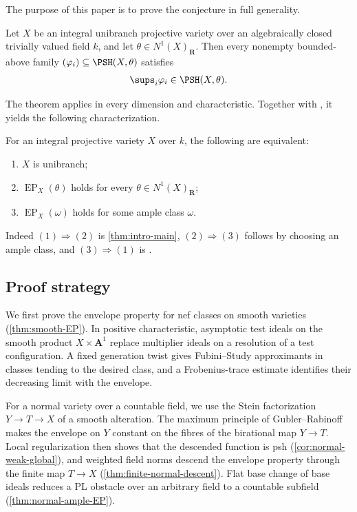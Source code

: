 \documentclass[11pt,a4paper]{article}
\newcommand{\EP}{\operatorname{EP}}
\begin{document}
The purpose of this paper is to prove the conjecture in full generality.

\begin{maintheorem}\label{thm:intro-main}
Let $X$ be an integral unibranch projective variety over an algebraically closed trivially valued field $k$, and let $\theta\in N^1(X)_{\mathbf{R}}$.  Then every nonempty bounded-above family $(\varphi_i)\subseteq\PSH(X,\theta)$ satisfies
\[
    \sups_i\varphi_i \in\PSH(X,\theta).
\]
\end{maintheorem}

The theorem applies in every dimension and characteristic. Together with \cite[Theorem~5.12]{BJ22}, it yields the following characterization.

\begin{samepage}
\begin{corollary}\label{cor:intro-characterization}
For an integral projective variety $X$ over $k$, the following are equivalent:
\begin{enumerate}
\item $X$ is unibranch;
\item $\EP_X(\theta)$ holds for every $\theta\in N^1(X)_{\mathbf{R}}$;
\item $\EP_X(\omega)$ holds for some ample class $\omega$.
\end{enumerate}
\end{corollary}
\end{samepage}

Indeed $(1)\Rightarrow(2)$ is \cref{thm:intro-main}, $(2)\Rightarrow(3)$ follows by choosing an ample class, and $(3)\Rightarrow(1)$ is \cite[Theorem~5.12]{BJ22}.

\subsection{Proof strategy}

We first prove the envelope property for nef classes on smooth varieties (\cref{thm:smooth-EP}). In positive characteristic, asymptotic test ideals on the smooth product $X\times\mathbf A^1$ replace multiplier ideals on a resolution of a test configuration. A fixed generation twist gives Fubini--Study approximants in classes tending to the desired class, and a Frobenius-trace estimate identifies their decreasing limit with the envelope.

For a normal variety over a countable field, we use the Stein factorization $Y\to T\to X$ of a smooth alteration. The maximum principle of Gubler--Rabinoff \cite[Theorem~6.1]{GublerRabinoff25} makes the envelope on $Y$ constant on the fibres of the birational map $Y\to T$. Local regularization then shows that the descended function is psh (\cref{cor:normal-weak-global}), and weighted field norms descend the envelope property through the finite map $T\to X$ (\cref{thm:finite-normal-descent}). Flat base change of base ideals reduces a PL obstacle over an arbitrary field to a countable subfield (\cref{thm:normal-ample-EP}).
\end{document}
